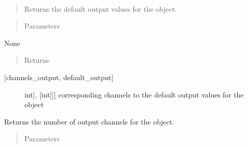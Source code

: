 \documentclass[letterpaper,10pt,english]{sphinxmanual}
\begin{document}
\begin{fulllineitems}
\begin{fulllineitems}
\begin{description}
\end{description}

\end{fulllineitems}


\begin{fulllineitems}
\label{\detokenize{base:OutputObject.OutputObject.get_default_outputs}}~\begin{quote}

\sphinxAtStartPar
Returns the default output values for the object.
\end{quote}
\begin{quote}\begin{description}
\item[{Parameters}] \leavevmode
\end{description}\end{quote}

\sphinxAtStartPar
None
\begin{quote}\begin{description}
\item[{Returns}] \leavevmode
\end{description}\end{quote}
\begin{description}
\item[{{[}channels\_output, default\_output{]}}] \leavevmode{[}{[}{[}int{]}, {[}int{]}{]}{]}
\sphinxAtStartPar
corresponding channels to the default output values for the object

\end{description}

\end{fulllineitems}


\begin{fulllineitems}
\label{\detokenize{base:OutputObject.OutputObject.get_num_channels}}
\sphinxAtStartPar
Returns the number of output channels for the object.
\begin{quote}\begin{description}
\item[{Parameters}] \leavevmode
\end{description}\end{quote}


\end{fulllineitems}
\end{fulllineitems}
\end{document}
